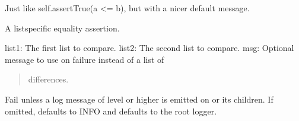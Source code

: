 \documentclass[letterpaper,10pt,english]{sphinxmanual}
\begin{document}
\begin{fulllineitems}
\begin{fulllineitems}
\end{fulllineitems}


\begin{fulllineitems}
\label{\detokenize{_autosummary/tests.test_unit.test_df:tests.test_unit.test_df.assertLessEqual}}
\pysigstartsignatures
{}
\pysigstopsignatures
\sphinxAtStartPar
Just like self.assertTrue(a \textless{}= b), but with a nicer default message.

\end{fulllineitems}


\begin{fulllineitems}
\label{\detokenize{_autosummary/tests.test_unit.test_df:tests.test_unit.test_df.assertListEqual}}
\pysigstartsignatures
{}
\pysigstopsignatures
\sphinxAtStartPar
A list\sphinxhyphen{}specific equality assertion.
\begin{description}
\sphinxAtStartPar
list1: The first list to compare.
list2: The second list to compare.
msg: Optional message to use on failure instead of a list of
\begin{quote}

\sphinxAtStartPar
differences.
\end{quote}

\end{description}

\end{fulllineitems}


\begin{fulllineitems}
\label{\detokenize{_autosummary/tests.test_unit.test_df:tests.test_unit.test_df.assertLogs}}
\pysigstartsignatures
{}
\pysigstopsignatures
\sphinxAtStartPar
Fail unless a log message of level  or higher is emitted
on  or its children.  If omitted,  defaults to
INFO and  defaults to the root logger.


\end{fulllineitems}
\end{fulllineitems}
\end{document}
